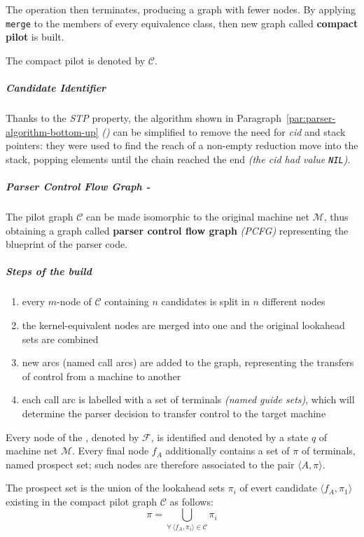 \documentclass[english]{article}
\begin{document}
The operation then terminates, producing a graph with fewer nodes.
By applying \texttt{merge} to the members of every equivalence class, then new graph called \textbf{compact pilot} is built.

The compact pilot is denoted by \(\mathcal{C}\).

\subparagraph*{Candidate Identifier}

Thanks to the \textit{STP} property, the algorithm shown in Paragraph~\ref{par:parser-algorithm-bottom-up} \textit{()} can be simplified to remove the need for \textit{cid} and stack pointers:
they were used to find the reach of a non-empty reduction move into the stack, popping elements until the chain reached the end \textit{(the \textit{cid} had value \texttt{NIL})}.

\subparagraph*{Parser Control Flow Graph - \PCFG}

The pilot graph \(\mathcal{C}\) can be made isomorphic to the original machine net \(\mathcal{M}\), thus obtaining a graph called \textbf{parser control flow graph} \textit{(PCFG)} representing the blueprint of the parser code.

\subparagraph*{Steps of the build}

\begin{enumerate}
  \item every \(m\)-node of \(\mathcal{C}\) containing \(n\) candidates is split in \(n\) different nodes
  \item the kernel-equivalent nodes are merged into one and the original lookahead sets are combined
  \item new arcs (named call arcs) are added to the graph, representing the transfers of control from a machine to another
  \item each call arc is labelled with a set of terminals \textit{(named guide sets)}, which will determine the parser decision to transfer control to the target machine
\end{enumerate}

\bigskip
Every node of the \PCFG, denoted by \(\mathcal{F}\), is identified and denoted by a state \(q\) of machine net \(\mathcal{M}\).
Every final node \(f_A\) additionally contains a set of \(\pi\) of terminals, named prospect set;
such nodes are therefore associated to the pair \(\langle A, \pi \rangle\).

The prospect set is the union of the lookahead sets \(\pi_i\) of evert candidate \(\langle f_A, \pi_1\rangle\) existing in the compact pilot graph \(\mathcal{C}\) as follows:
\[ \pi = \bigcup_{\forall \, \langle f_A, \pi_i \rangle \in \mathcal{C}} \pi_i \]
\end{document}
